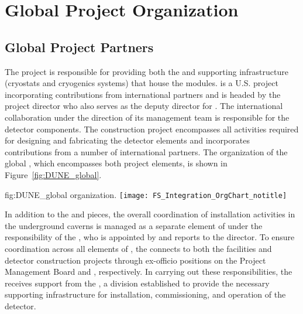 \chapter{Global Project Organization}
\label{vl:tc-global}

\section{Global Project Partners}
\label{sec:partners}

The  project is responsible for providing both the
 and supporting infrastructure (cryostats and
cryogenics systems) that house the  
modules.  is a U.S.  project incorporating
contributions from international partners and is headed by the
 project director who also serves as the 
deputy director for .  
The international 
collaboration under the direction of its management team is
responsible for the detector components.  The  
construction project encompasses all activities required for designing
and fabricating the detector elements and incorporates contributions
from a number of international partners.  The organization of the
global , which encompasses both project elements, is
shown in Figure~\ref{fig:DUNE_global}.
\begin{dunefigure}{fig:DUNE_global}
  { organization.}
  \texttt{[image: FS\_Integration\_OrgChart\_notitle]}
\end{dunefigure}

In addition to the  and  pieces, the overall
coordination of installation activities in the underground caverns 
is managed as a separate element of  under the
responsibility of the , who is appointed by and reports
to the  director.  To ensure coordination across
all elements of , the  connects to both
the facilities and detector construction projects through ex-officio
positions on the  Project Management Board and
 , respectively.  In carrying out these
responsibilities, the  receives support from the ,
a  division established to 
provide the necessary supporting infrastructure for installation, commissioning, and operation 
of the  detector.

